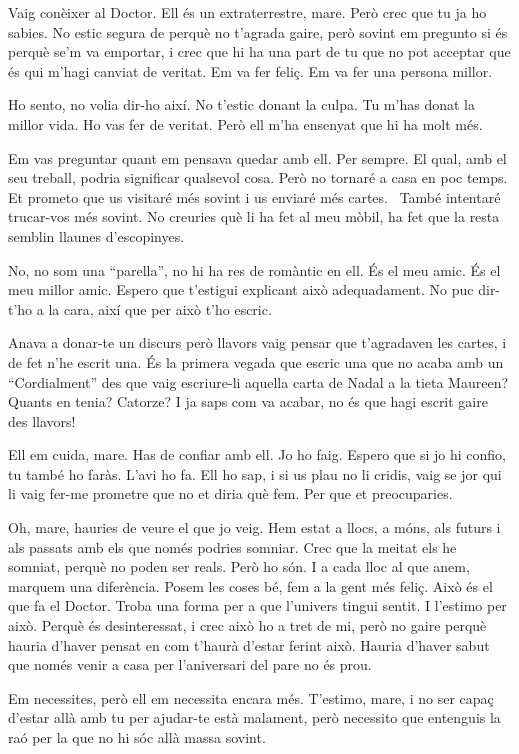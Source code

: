 Vaig conèixer al Doctor. Ell és un extraterrestre, mare. Però crec que
tu ja ho sabies. No estic segura de perquè no t'agrada gaire, però
sovint em pregunto si és perquè se'm va emportar, i crec que hi ha una
part de tu que no pot acceptar que és qui m'hagi canviat de veritat. Em
va fer feliç. Em va fer una persona millor.

Ho sento, no volia dir-ho així. No t'estic donant la culpa. Tu m'has
donat la millor vida. Ho vas fer de veritat. Però ell m'ha ensenyat que
hi ha molt més.

Em vas preguntar quant em pensava quedar amb ell. Per sempre. El qual,
amb el seu treball, podria significar qualsevol cosa. Però no tornaré a
casa en poc temps. Et prometo que us visitaré més sovint i us enviaré
més cartes. ~També intentaré trucar-vos més sovint. No creuries què li
ha fet al meu mòbil, ha fet que la resta semblin llaunes d'escopinyes.

No, no som una ``parella'', no hi ha res de romàntic en ell. És el meu
amic. És el meu millor amic. Espero que t'estigui explicant això
adequadament. No puc dir-t'ho a la cara, així que per això t'ho escric.

Anava a donar-te un discurs però llavors vaig pensar que t'agradaven les
cartes, i de fet n'he escrit una. És la primera vegada que escric una
que no acaba amb un ``Cordialment'' des que vaig escriure-li aquella
carta de Nadal a la tieta Maureen? Quants en tenia? Catorze? I ja saps
com va acabar, no és que hagi escrit gaire des llavors!

Ell em cuida, mare. Has de confiar amb ell. Jo ho faig. Espero que si jo
hi confio, tu també ho faràs. L'avi ho fa. Ell ho sap, i si us plau no
li cridis, vaig se jor qui li vaig fer-me prometre que no et diria què
fem. Per que et preocuparies.

Oh, mare, hauries de veure el que jo veig. Hem estat a llocs, a móns,
als futurs i als passats amb els que només podries somniar. Crec que la
meitat els he somniat, perquè no poden ser reals. Però ho són. I a cada
lloc al que anem, marquem una diferència. Posem les coses bé, fem a la
gent més feliç. Això és el que fa el Doctor. Troba una forma per a que
l'univers tingui sentit. I l'estimo per això. Perquè és desinteressat, i
crec això ho a tret de mi, però no gaire perquè hauria d'haver pensat en
com t'haurà d'estar ferint això. Hauria d'haver sabut que només venir a
casa per l'aniversari del pare no és prou.

Em necessites, però ell em necessita encara més. T'estimo, mare, i no
ser capaç d'estar allà amb tu per ajudar-te està malament, però
necessito que entenguis la raó per la que no hi sóc allà massa sovint.

